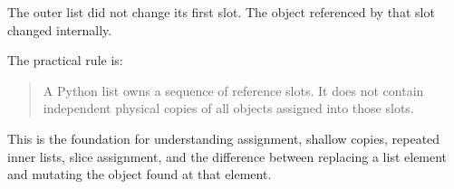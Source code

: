 The outer list did not change its first slot. The object referenced by that slot changed internally.

The practical rule is:

\begin{quote}
A Python list owns a sequence of reference slots. It does not contain independent physical copies of all objects assigned into those slots.
\end{quote}

This is the foundation for understanding assignment, shallow copies, repeated inner lists, slice assignment, and the difference between replacing a list element and mutating the object found at that element.
